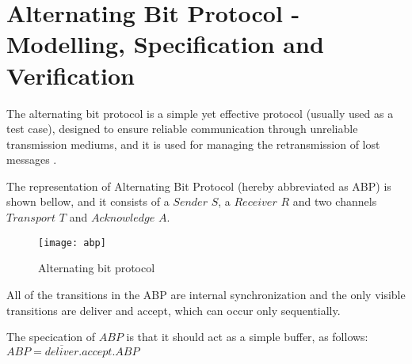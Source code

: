 \section{Alternating Bit Protocol - Modelling, Specification and Verification}
The alternating bit protocol is a simple yet effective protocol (usually used as a test case), designed to ensure reliable communication through unreliable transmission mediums, and it is used for managing the retransmission of lost messages \cite{ReactiveSystems3}\cite{Kulick}.

The representation of Alternating Bit Protocol (hereby abbreviated as ABP) is shown bellow, and it consists of a $Sender$ $S$, a $Receiver$ $R$ and two channels $Transport$ $T$ and $Acknowledge$ $A$. 

\begin{figure}[!ht]
\centering
\texttt{[image: abp]}
\caption{Alternating bit protocol}
\label{fig:abp}
\end{figure}

All of the transitions in the ABP are internal synchronization and the only visible transitions are deliver and accept, which can occur only sequentially. 

The specication of $ABP$ is that it should act as a simple buffer, as follows:\\
$ABP=\overline{deliver}.accept.ABP$

